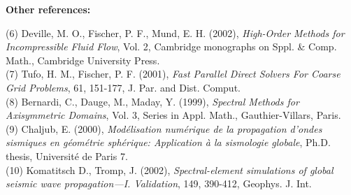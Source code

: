 \documentclass{article}
\begin{document}

\noindent \textbf{Other references:}\vspace*{0.2cm}

(6) Deville, M. O., Fischer, P. F., Mund, E. H. (2002), 
\textit{High-Order Methods for Incompressible Fluid Flow}, 
Vol. 2, Cambridge monographs on Sppl. \& Comp. Math., Cambridge University Press.\\

(7) Tufo, H. M., Fischer, P. F. (2001), \textit{Fast Parallel Direct Solvers For Coarse Grid Problems}, 
61, 151-177, J. Par. and Dist. Comput.\\

(8) Bernardi, C., Dauge, M., Maday, Y. (1999), \textit{Spectral Methods for Axisymmetric Domains}, 
Vol. 3, Series in Appl. Math., Gauthier-Villars, Paris.\\

(9) Chaljub, E. (2000), \textit{Mod{\'{e}}lisation num{\'{e}}rique de la 
propagation d'ondes sismiques en g{\'{e}}om{\'{e}}trie sph{\'{e}}rique:
Application {\`{a}} la sismologie globale}, 
Ph.D. thesis, Universit{\'{e}} de Paris 7.\\

(10) Komatitsch D., Tromp, J. (2002), \textit{Spectral-element simulations of
global seismic wave propagation---I. Validation},
149, 390-412, Geophys. J. Int.
\end{document}
